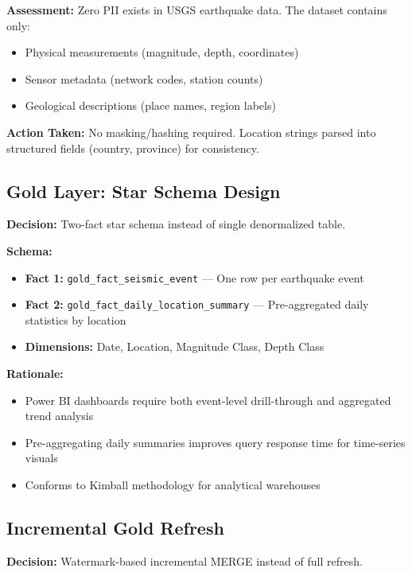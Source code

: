 \documentclass[11pt,a4paper]{article}
\begin{document}
\noindent\textbf{Assessment:} Zero PII exists in USGS earthquake data. The dataset contains only:
\begin{itemize}[nosep]
    \item Physical measurements (magnitude, depth, coordinates)
    \item Sensor metadata (network codes, station counts)
    \item Geological descriptions (place names, region labels)
\end{itemize}

\noindent\textbf{Action Taken:} No masking/hashing required. Location strings parsed into structured fields (country, province) for consistency.

\subsection{Gold Layer: Star Schema Design}

\noindent\textbf{Decision:} Two-fact star schema instead of single denormalized table.

\noindent\textbf{Schema:}
\begin{itemize}[nosep]
    \item \textbf{Fact 1:} \texttt{gold\_fact\_seismic\_event} — One row per earthquake event
    \item \textbf{Fact 2:} \texttt{gold\_fact\_daily\_location\_summary} — Pre-aggregated daily statistics by location
    \item \textbf{Dimensions:} Date, Location, Magnitude Class, Depth Class
\end{itemize}

\noindent\textbf{Rationale:}
\begin{itemize}[nosep]
    \item Power BI dashboards require both event-level drill-through and aggregated trend analysis
    \item Pre-aggregating daily summaries improves query response time for time-series visuals
    \item Conforms to Kimball methodology for analytical warehouses
\end{itemize}

\subsection{Incremental Gold Refresh}

\noindent\textbf{Decision:} Watermark-based incremental MERGE instead of full refresh.
\end{document}
